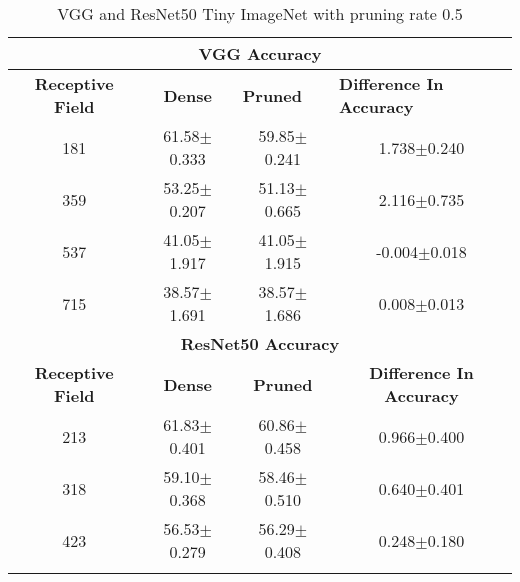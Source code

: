 \begin{table}[H]
  \centering
\begin{tabular}{@{}cccc@{}}
\toprule
\multicolumn{4}{c}{\textbf{VGG  Accuracy}}                                                                                                                                  \\ \midrule
\textbf{Receptive Field} & \textbf{Dense} & \multicolumn{1}{l}{\textbf{Pruned}} & \multicolumn{1}{l}{\textbf{Difference In Accuracy}} \\ \midrule
181                      & 61.58$\pm$0.333              & 59.85$\pm$0.241                                   & 1.738$\pm$0.240                                     \\
359                      & 53.25$\pm$0.207              & 51.13$\pm$0.665                                   & 2.116$\pm$0.735                                     \\
537                      & 41.05$\pm$1.917              & 41.05$\pm$1.915                                   & -0.004$\pm$0.018                                    \\
715                      & 38.57$\pm$1.691              & 38.57$\pm$1.686                                   & 0.008$\pm$0.013                                     \\ \midrule
\multicolumn{4}{c}{\textbf{ResNet50  Accuracy}}                                                                                                                             \\ \midrule
\textbf{Receptive Field} & \textbf{Dense} & \textbf{Pruned}                     & \textbf{Difference In Accuracy}                     \\
213                      & 61.83$\pm$0.401              & 60.86$\pm$0.458                                   & 0.966$\pm$0.400                                     \\
318                      & 59.10$\pm$0.368              & 58.46$\pm$0.510                                   & 0.640$\pm$0.401                                     \\
423                      & 56.53$\pm$0.279              & 56.29$\pm$0.408                                   &
0.248$\pm$0.180                                     \\ \bottomrule \\
\end{tabular}
\caption{VGG and ResNet50 Tiny ImageNet with pruning rate 0.5}
\label{tab:tiny imagenet pruning rate05}
\end{table}

